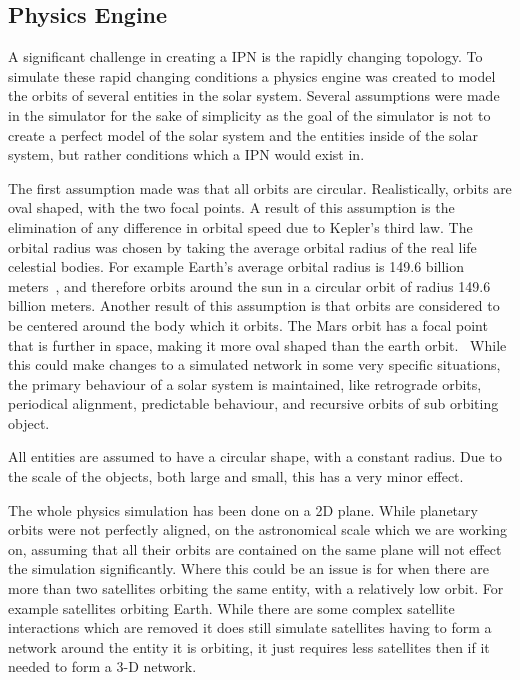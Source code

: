 \documentclass[a4paper,12pt]{article}
\begin{document}
\subsection{Physics Engine}

A significant challenge in creating a IPN is the rapidly changing topology. To
simulate these rapid changing conditions a physics engine was created to model
the orbits of several entities in the solar system. Several assumptions were
made in the simulator for the sake of simplicity as the goal of the simulator is
not to create a perfect model of the solar system and the entities inside of the
solar system, but rather conditions which a IPN would exist in.

The first assumption made was that all orbits are circular. Realistically,
orbits are oval shaped, with the two focal points. A result of this assumption
is the elimination of any difference in orbital speed due to Kepler's third law.
The orbital radius was chosen by taking the average orbital radius of the real
life celestial bodies. For example Earth's average orbital radius is 149.6
billion meters~\cite{nasa_earth}, and therefore orbits around the sun in a
circular orbit of radius 149.6 billion meters. Another result of this assumption
is that orbits are considered to be centered around the body which it orbits.
The Mars orbit has a focal point that is further in space, making it more oval
shaped than the earth orbit.~\cite{nasa_mars} While this could make changes to a
simulated network in some very specific situations, the primary behaviour of a
solar system is maintained, like retrograde orbits, periodical alignment,
predictable behaviour, and recursive orbits of sub orbiting object.

All entities are assumed to have a circular shape, with a constant radius. Due
to the scale of the objects, both large and small, this has a very minor effect.

The whole physics simulation has been done on a 2D plane. While planetary orbits
were not perfectly aligned, on the astronomical scale which we are working on,
assuming that all their orbits are contained on the same plane will not effect
the simulation significantly. Where this could be an issue is for when there are
more than two satellites orbiting the same entity, with a relatively low orbit.
For example satellites orbiting Earth. While there are some complex satellite
interactions which are removed it does still simulate satellites having to form
a network around the entity it is orbiting, it just requires less satellites
then if it needed to form a 3-D network.
\end{document}
